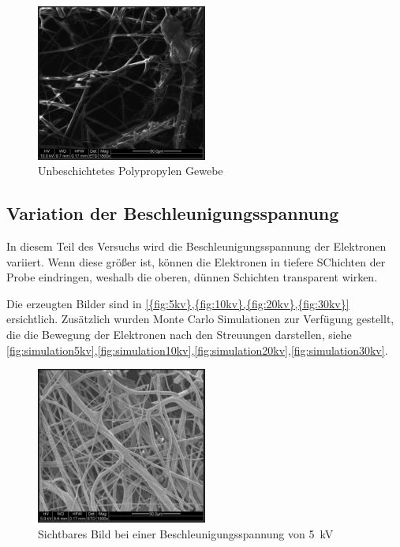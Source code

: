 \documentclass[12pt,english,ngerman]{scrartcl}
\begin{document}
\begin{figure}[H]
	\begin{center}
		\includegraphics[width =0.5\textwidth]{./figures/unbedampft.png}
	\end{center}
	\caption{Unbeschichtetes Polypropylen Gewebe}
    \label{fig:unbeschichtet}
\end{figure}

\subsection{Variation der Beschleunigungsspannung}

In diesem Teil des Versuchs wird die Beschleunigungsspannung der Elektronen variiert. Wenn diese größer ist, können die 
Elektronen in tiefere SChichten der Probe eindringen, weshalb die oberen, dünnen Schichten transparent wirken. 

Die erzeugten Bilder sind in \autoref{{fig:5kv},{fig:10kv},{fig:20kv},{fig:30kv}} ersichtlich. 
Zusätzlich wurden Monte Carlo Simulationen zur Verfügung gestellt, die die Bewegung der Elektronen nach den Streuungen
darstellen, siehe \autoref{fig:simulation5kv},\autoref{fig:simulation10kv},\autoref{fig:simulation20kv},\autoref{fig:simulation30kv}.


\begin{figure}[H]
	\begin{center}
		\includegraphics[width =0.5\textwidth]{./figures/5kv.png}
	\end{center}
	\caption{Sichtbares Bild bei einer Beschleunigungsspannung von \SI{5}{\kilo\volt}}
    \label{fig:5kv}
\end{figure}
\end{document}
